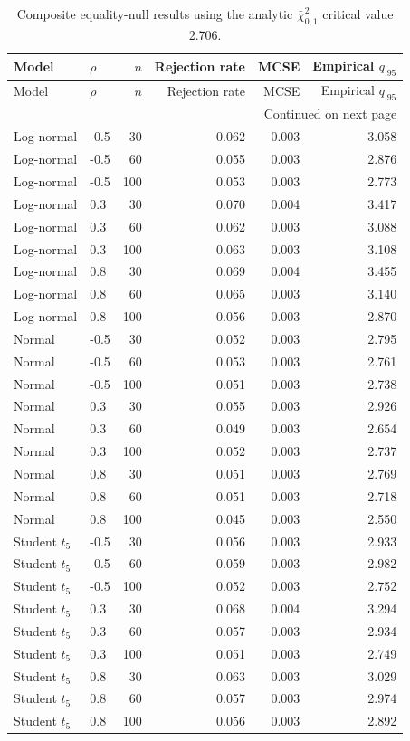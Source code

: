 \documentclass[11pt]{article}
\theoremstyle{remark}
\begin{document}
\begin{longtable}{llrrrr}
\caption{Composite equality-null results using the analytic $\bar\chi^2_{0,1}$ critical value 2.706.}\label{tab:composite-full}\\
\toprule
Model & $\rho$ & $n$ & Rejection rate & MCSE & Empirical $q_{.95}$ \\
\midrule
\endfirsthead
\toprule
Model & $\rho$ & $n$ & Rejection rate & MCSE & Empirical $q_{.95}$ \\
\midrule
\endhead
\midrule
\multicolumn{6}{r}{Continued on next page}\\
\endfoot
\bottomrule
\endlastfoot
Log-normal & -0.5 & 30 & 0.062 & 0.003 & 3.058 \\
Log-normal & -0.5 & 60 & 0.055 & 0.003 & 2.876 \\
Log-normal & -0.5 & 100 & 0.053 & 0.003 & 2.773 \\
Log-normal & 0.3 & 30 & 0.070 & 0.004 & 3.417 \\
Log-normal & 0.3 & 60 & 0.062 & 0.003 & 3.088 \\
Log-normal & 0.3 & 100 & 0.063 & 0.003 & 3.108 \\
Log-normal & 0.8 & 30 & 0.069 & 0.004 & 3.455 \\
Log-normal & 0.8 & 60 & 0.065 & 0.003 & 3.140 \\
Log-normal & 0.8 & 100 & 0.056 & 0.003 & 2.870 \\
Normal & -0.5 & 30 & 0.052 & 0.003 & 2.795 \\
Normal & -0.5 & 60 & 0.053 & 0.003 & 2.761 \\
Normal & -0.5 & 100 & 0.051 & 0.003 & 2.738 \\
Normal & 0.3 & 30 & 0.055 & 0.003 & 2.926 \\
Normal & 0.3 & 60 & 0.049 & 0.003 & 2.654 \\
Normal & 0.3 & 100 & 0.052 & 0.003 & 2.737 \\
Normal & 0.8 & 30 & 0.051 & 0.003 & 2.769 \\
Normal & 0.8 & 60 & 0.051 & 0.003 & 2.718 \\
Normal & 0.8 & 100 & 0.045 & 0.003 & 2.550 \\
Student $t_5$ & -0.5 & 30 & 0.056 & 0.003 & 2.933 \\
Student $t_5$ & -0.5 & 60 & 0.059 & 0.003 & 2.982 \\
Student $t_5$ & -0.5 & 100 & 0.052 & 0.003 & 2.752 \\
Student $t_5$ & 0.3 & 30 & 0.068 & 0.004 & 3.294 \\
Student $t_5$ & 0.3 & 60 & 0.057 & 0.003 & 2.934 \\
Student $t_5$ & 0.3 & 100 & 0.051 & 0.003 & 2.749 \\
Student $t_5$ & 0.8 & 30 & 0.063 & 0.003 & 3.029 \\
Student $t_5$ & 0.8 & 60 & 0.057 & 0.003 & 2.974 \\
Student $t_5$ & 0.8 & 100 & 0.056 & 0.003 & 2.892 \\
\end{longtable}
\end{document}
